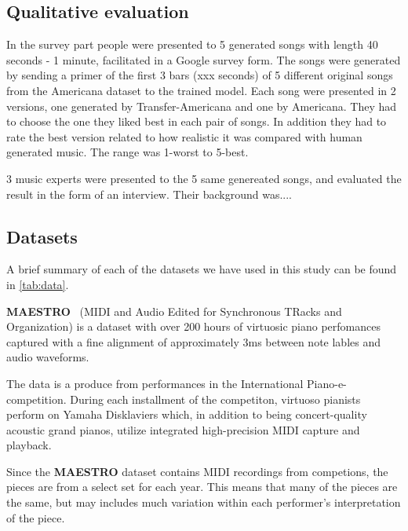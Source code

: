 \documentclass{IEEEtran}
\begin{document}
        \subsection{Qualitative evaluation}
        In the survey part people were presented to 5 generated songs with length 
        40 seconds - 1 minute, facilitated in a Google survey form. The songs were generated by sending a primer of the first 3 bars (xxx seconds) of 5 different original songs from the Americana dataset to the trained model. Each song were 
        presented in 2 versions, one generated  by Transfer-Americana and one by Americana. 
        They had to choose the one they liked best in each pair of songs. In addition they 
        had to rate the best version related to how realistic it was compared with human 
        generated music. The range was 1-worst to 5-best.

        3 music experts were presented to the 5 same genereated songs, and evaluated 
        the result in the form of an interview. Their background was....

    \subsection{Datasets}

        A brief summary of each of the datasets we have used in this study 
        can be found in \autoref{tab:data}.

        \textbf{MAESTRO}~\cite{maestrodataset}
        (MIDI and Audio Edited for Synchronous TRacks and Organization)
        is a dataset with over 200 hours of virtuosic piano perfomances captured with 
        a fine alignment of approximately 3ms between note lables and audio waveforms.

        The data is a produce from performances in the International Piano-e-competition.
        During each installment of the competiton, virtuoso pianists perform on Yamaha
        Disklaviers which, in addition to being concert-quality acoustic grand pianos,
        utilize integrated high-precision MIDI capture and playback.
            
        Since the \textbf{MAESTRO} dataset contains MIDI recordings from competions, 
        the pieces are from a select set for each year. This means that many of the 
        pieces are the same, but may includes much variation within each
        performer's interpretation of the piece. 
\end{document}
